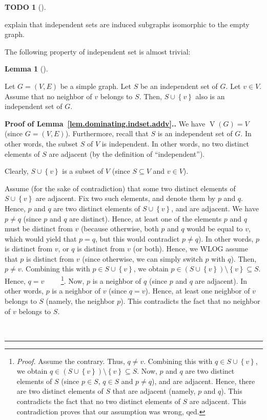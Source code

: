 \documentclass[numbers=enddot,12pt,final,onecolumn,notitlepage]{scrartcl}%
\theoremstyle{definition}
\newtheorem{lem}[theo]{Lemma}
\newenvironment{lemma}[1][]
{\begin{lem}[#1]\begin{leftbar}}
{\end{leftbar}\end{lem}}
\newtheorem{quest}[theo]{TODO}
\newenvironment{todo}[1][]
{\begin{quest}[#1]\begin{leftbar}}
{\end{leftbar}\end{quest}}
\newenvironment{proof}[1][Proof]{\noindent\textbf{#1.} }{\ \rule{0.5em}{0.5em}}
\newcommand{\set}[1]{\left\{ #1 \right\}}
\newcommand{\tup}[1]{\left( #1 \right)}
\newcommand{\verts}[1]{\operatorname{V}\left( #1 \right)}
\begin{document}
\begin{todo}
explain that independent sets are induced subgraphs isomorphic
to the empty graph.
\end{todo}

The following property of independent set is almost trivial:

\begin{lemma} \label{lem.dominating.indset.addv}
Let $G = \tup{V, E}$ be a simple graph. Let $S$ be an independent set
of $G$. Let $v \in V$. Assume that no neighbor of $v$ belongs to $S$.
Then, $S \cup \set{v}$ also is an independent set of $G$.
\end{lemma}

\begin{proof}[Proof of Lemma~\ref{lem.dominating.indset.addv}.]
We have $\verts{G} = V$ (since $G = \tup{V, E}$). Furthermore, recall
that $S$ is an independent set of $G$. In other words,
the subset $S$ of $V$ is independent. In other words, no two
distinct elements of $S$ are adjacent (by the definition of
``independent'').

Clearly, $S \cup \set{v}$ is a subset of $V$ (since $S \subseteq V$
and $v \in V$).

Assume (for the sake of contradiction) that some two distinct elements
of $S \cup \set{v}$ are adjacent. Fix two such elements, and denote
them by $p$ and $q$. Hence, $p$ and $q$ are two distinct elements of
$S \cup \set{v}$, and are adjacent.
We have $p \neq q$ (since $p$ and $q$ are distinct). Hence,
at least one of the elements $p$ and $q$ must be distinct from $v$
(because otherwise, both $p$ and $q$ would be equal to $v$, which
would yield that $p = q$, but this would contradict $p \neq q$). In
other words, $p$ is distinct from $v$, or $q$ is distinct from $v$
(or both). Hence, we WLOG assume that $p$ is distinct from $v$ (since
otherwise, we can simply switch $p$ with $q$). Then, $p \neq v$.
Combining this with $p \in S \cup \set{v}$, we obtain
$p \in \tup{S \cup \set{v}} \setminus \set{v} \subseteq S$. Hence,
$q = v$ \ \ \ \ \footnote{\textit{Proof.} Assume the contrary. Thus,
$q \neq v$. Combining this with $q \in S \cup \set{v}$, we obtain
$q \in \tup{S \cup \set{v}} \setminus \set{v} \subseteq S$. Now, $p$
and $q$ are two distinct elements of $S$ (since $p \in S$, $q \in S$
and $p \neq q$), and are adjacent. Hence, there are two distinct
elements of $S$ that are adjacent (namely, $p$ and $q$). This
contradicts the fact that no two distinct elements of $S$ are
adjacent. This contradiction proves that our assumption was wrong,
qed.}. Now, $p$ is a neighbor of $q$ (since $p$ and $q$ are adjacent).
In other words, $p$ is a neighbor of $v$ (since $q = v$). Hence,
at least one neighbor of $v$ belongs to $S$ (namely, the neighbor
$p$). This contradicts the fact that no neighbor of $v$ belongs to
$S$.


\end{proof}
\end{document}
